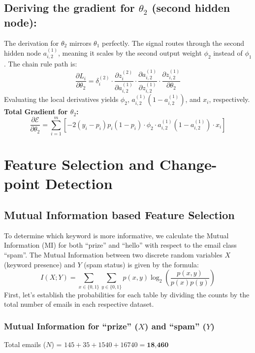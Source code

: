 \documentclass[twoside, 10pt]{article}
\begin{document}
\subsection{Deriving the gradient for \texorpdfstring{$\theta_2$}{theta2} (second hidden node):}
The derivation for $\theta_2$ mirrors $\theta_1$ perfectly. The signal routes through the second hidden node $a_{i,2}^{(1)}$, meaning it scales by the second output weight $\phi_2$ instead of $\phi_1$.
The chain rule path is:
\begin{equation}
    \frac{\partial L_i}{\partial \theta_2} = \delta_i^{(2)} \cdot \frac{\partial z_i^{(2)}}{\partial a_{i,2}^{(1)}} \cdot \frac{\partial a_{i,2}^{(1)}}{\partial z_{i,2}^{(1)}} \cdot \frac{\partial z_{i,2}^{(1)}}{\partial \theta_2}
\end{equation}
Evaluating the local derivatives yields $\phi_2$, $a_{i,2}^{(1)}(1 - a_{i,2}^{(1)})$, and $x_i$, respectively.
\textbf{Total Gradient for $\theta_2$:}
\begin{equation}
    \frac{\partial \mathcal{E}}{\partial \theta_2} = \sum_{i=1}^m \left[ -2(y_i - p_i) p_i(1 - p_i) \cdot \phi_2 \cdot a_{i,2}^{(1)}(1 - a_{i,2}^{(1)}) \cdot x_i \right]
\end{equation}

\section{Feature Selection and Change-point Detection}

\subsection{Mutual Information based Feature Selection}
To determine which keyword is more informative, we calculate the Mutual Information (MI) for both ``prize'' and ``hello'' with respect to the email class ``spam''. 
The Mutual Information between two discrete random variables $X$ (keyword presence) and $Y$ (spam status) is given by the formula:
\begin{equation}
    I(X;Y) = \sum_{x \in \{0,1\}} \sum_{y \in \{0,1\}} p(x,y) \log_2 \left( \frac{p(x,y)}{p(x)p(y)} \right)
\end{equation}
First, let's establish the probabilities for each table by dividing the counts by the total number of emails in each respective dataset.
\subsubsection{Mutual Information for ``prize'' \texorpdfstring{($X$)}{(X)} and ``spam'' \texorpdfstring{($Y$)}{(Y)}}
Total emails ($N$) = $145 + 35 + 1540 + 16740 = \textbf{18,460}$
\end{document}
